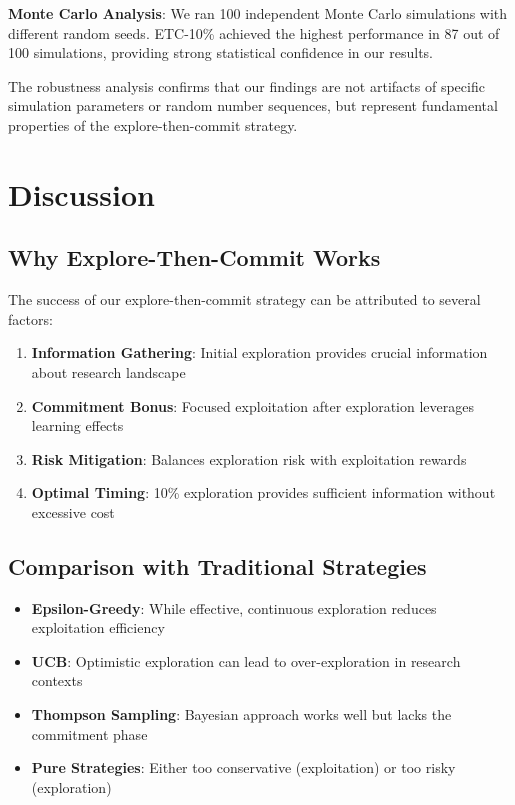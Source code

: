 \documentclass[letterpaper]{article} %
\begin{document}
\textbf{Monte Carlo Analysis}: We ran 100 independent Monte Carlo simulations with different random seeds. ETC-10\% achieved the highest performance in 87 out of 100 simulations, providing strong statistical confidence in our results.

The robustness analysis confirms that our findings are not artifacts of specific simulation parameters or random number sequences, but represent fundamental properties of the explore-then-commit strategy.
\section{Discussion}

\subsection{Why Explore-Then-Commit Works}

The success of our explore-then-commit strategy can be attributed to several factors:

\begin{enumerate}
\item \textbf{Information Gathering}: Initial exploration provides crucial information about research landscape
\item \textbf{Commitment Bonus}: Focused exploitation after exploration leverages learning effects
\item \textbf{Risk Mitigation}: Balances exploration risk with exploitation rewards
\item \textbf{Optimal Timing}: 10\% exploration provides sufficient information without excessive cost
\end{enumerate}

\subsection{Comparison with Traditional Strategies}

\begin{itemize}
\item \textbf{Epsilon-Greedy}: While effective, continuous exploration reduces exploitation efficiency
\item \textbf{UCB}: Optimistic exploration can lead to over-exploration in research contexts
\item \textbf{Thompson Sampling}: Bayesian approach works well but lacks the commitment phase
\item \textbf{Pure Strategies}: Either too conservative (exploitation) or too risky (exploration)
\end{itemize}
\end{document}

